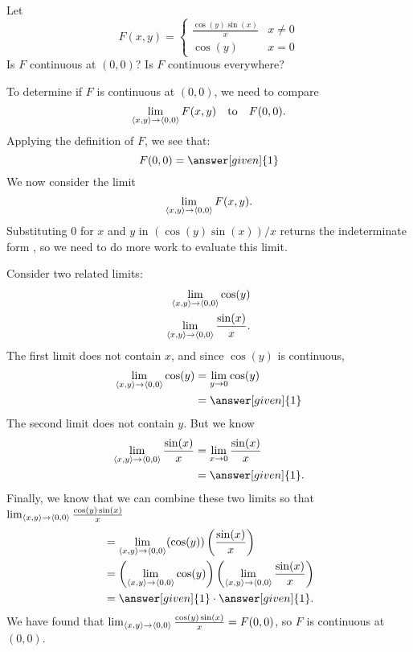 \documentclass{ximera}
\begin{document}
\begin{example}
  Let
  \[
  F(x,y) = \begin{cases}
    \frac{\cos(y)\sin(x)}{x} & x\neq 0 \\
    \cos(y) & x=0
  \end{cases}
  \]
  Is $F$ continuous at $(0,0)$? Is $F$ continuous everywhere?
  \begin{explanation}
    To determine if $F$ is continuous at $(0,0)$, we need to compare
    \[
    \lim_{\left\langle x,y\right\rangle\to\left\langle 0,0\right\rangle} F(x,y)\quad\text{to}\quad F(0,0).
    \]
    Applying the definition of $F$, we see that:
    \[
    F(0,0) = \answer[given]{1}
    \]
    We now consider the limit
    \[
    \lim_{\left\langle x,y\right\rangle\to\left\langle 0,0\right\rangle}F(x,y).
    \]
    Substituting $0$ for $x$ and $y$ in $(\cos(y)\sin(x))/x$ returns the
    indeterminate form \zeroOverZero, so we need to do more work to
    evaluate this limit.
    
    Consider two related limits:
    \begin{align*}
      \lim_{\left\langle x,y\right\rangle\to\left\langle 0,0\right\rangle} \cos(y)\\
      \lim_{\left\langle x,y\right\rangle\to\left\langle 0,0\right\rangle} \frac{\sin(x)}{x}.
    \end{align*}
    The first limit does not contain $x$, and since $\cos(y)$ is
    continuous,
    \begin{align*}
    \lim_{\vector{x,y}\to\vector{0,0}} \cos(y) &=\lim_{y\to 0} \cos(y) \\
    &=\answer[given]{1}
    \end{align*}
    The second limit does not contain $y$. But we know
    \begin{align*}
      \lim_{\vector{x,y}\to\vector{0,0}} \frac{\sin(x)}{x} &= \lim_{x\to 0} \frac{\sin(x)}{x} \\
      &= \answer[given]{1}.
    \end{align*}
    Finally, we know that we can combine these two limits so that 
    $\lim_{\left\langle x,y\right\rangle\to\left\langle 0,0\right\rangle} \frac{\cos(y)\sin(x)}{x}$
    \begin{align*}
      &= \lim_{\vector{x,y}\to\vector{0,0}} (\cos(y))\left(\frac{\sin(x)}{x}\right) \\ 
      &=\left(\lim_{\vector{x,y}\to\vector{0,0}} \cos(y)\right)\left(\lim_{\vector{x,y}\to\vector{0,0}} \frac{\sin(x)}{x}\right) \\
            &=\answer[given]{1}\cdot \answer[given]{1}.
    \end{align*}
    We have found that $\lim_{\left\langle x,y\right\rangle\to\left\langle 0,0\right\rangle} \frac{\cos(y)\sin(x)}{x} =
    F(0,0)$, so $F$ is continuous at $(0,0)$.


\end{explanation}
\end{example}
\end{document}
